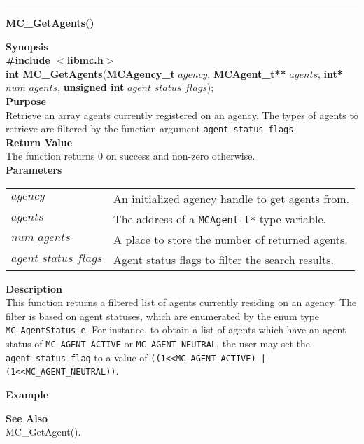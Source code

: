 \noindent
\vspace{5pt}
\rule{6.5in}{0.015in}
\noindent
{}
{\LARGE \bf MC\_GetAgents()}\\
\label{api:MC_GetAgents()}

\noindent
{\bf Synopsis}\\
{\bf \#include $<$libmc.h$>$}\\
{\bf int MC\_GetAgents}({\bf MCAgency\_t} $agency$, {\bf MCAgent\_t**} $agents$, {\bf int*} $num\_agents$, {\bf unsigned int} $agent\_status\_flags$);\\

\noindent
{\bf Purpose}\\
Retrieve an array agents currently registered on an agency. The types of agents
to retrieve are filtered by the function argument
\texttt{agent\_status\_flags}. \\

\noindent
{\bf Return Value}\\
The function returns 0 on success and non-zero otherwise.\\

\noindent
{\bf Parameters}
\vspace{-0.1in}
\begin{description}
\item
\begin{tabular}{p{30 mm}p{145 mm}} 
$agency$ & An initialized agency handle to get agents from.\\
$agents$ & The address of a \texttt{MCAgent\_t*} type variable. \\
$num\_agents$ & A place to store the number of returned agents.  \\
$agent\_status\_flags$ & Agent status flags to filter the search results. \\
\end{tabular}
\end{description}

\noindent
{\bf Description}\\
This function returns a filtered list of agents currently residing on an
agency. The filter is based on agent statuses, which are enumerated by the enum
type \texttt{MC\_AgentStatus\_e}. For instance, to obtain a list of agents
which have an agent status of \texttt{MC\_AGENT\_ACTIVE} or \texttt{MC\_AGENT\_NEUTRAL},
the user may set the \texttt{agent\_status\_flag} to a value of 
\texttt{((1<<MC\_AGENT\_ACTIVE) | (1<<MC\_AGENT\_NEUTRAL))}.

\noindent
{\bf Example}\\
\noindent
{\footnotesize}

\noindent
{\bf See Also}\\
MC\_GetAgent().

